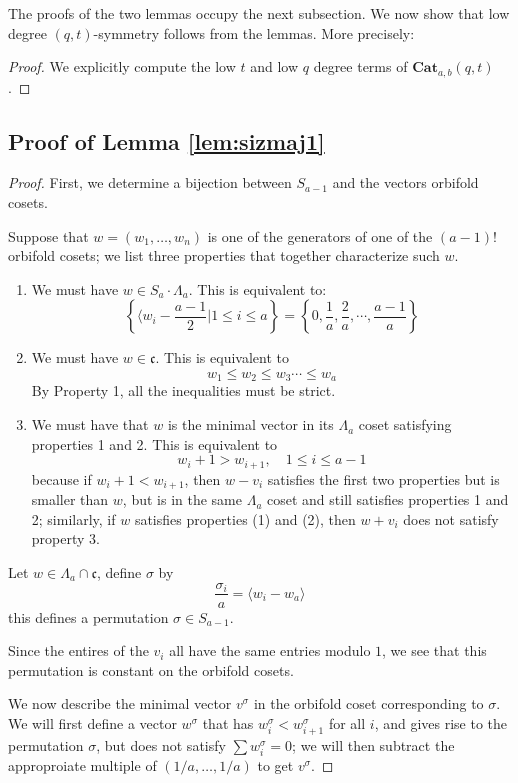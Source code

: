 \documentclass{amsart}[12pt]
\theoremstyle{definition}
\newcommand{\Cat}{\mathbf{Cat}}
\newcommand{\cone}{\mathfrak{c}}
\begin{document}
The proofs of the two lemmas occupy the next subsection.  We now show that low degree $(q,t)$-symmetry follows from the lemmas.  More precisely:


\begin{proof}
We explicitly compute the low $t$ and low $q$ degree terms of $\Cat_{a,b}(q,t)$.  


\end{proof}

\subsection{Proof of Lemma \ref{lem:sizmaj1}}
\begin{proof}
First, we determine a bijection between $S_{a-1}$ and the vectors orbifold cosets.  

Suppose that $w=(w_1,\dots, w_n)$ is one of the generators of one of the $(a-1)!$ orbifold cosets; we list three properties that together characterize such $w$.

\begin{enumerate}

\item We must have $w\in S_a\cdot \Lambda_a$. This is equivalent to:
$$\left\{ \langle w_i-\frac{a-1}{2}\Big| 1\leq i\leq a\right\}=\left\{0,\frac{1}{a},\frac{2}{a},\cdots,\frac{a-1}{a}\right\}$$

\item We must have $w\in\cone$.  This is equivalent to 
$$w_1\leq w_2 \leq w_3\cdots\leq w_a$$
By Property 1, all the inequalities must be strict.

\item We must have that $w$ is the minimal vector in its $\Lambda_a$  coset satisfying properties 1 and 2.  This is equivalent to
$$w_i+1>w_{i+1},\quad 1\leq i\leq a-1$$
because if $w_i+1<w_{i+1}$, then $w-v_i$ satisfies the first two properties but is smaller than $w$, but is in the same $\Lambda_a$ coset and still satisfies properties 1 and 2; similarly, if $w$ satisfies properties (1) and (2), then $w+v_i$ does not satisfy property 3.
\end{enumerate}

Let $w\in\Lambda_a\cap \cone$, define $\sigma$ by 
$$\frac{\sigma_i}{a}=\langle w_{i}-w_a\rangle$$
this defines a permutation $\sigma\in S_{a-1}$.

Since the entires of the $v_i$ all have the same entries modulo $1$, we see that this permutation is constant on the orbifold cosets.  

We now describe the minimal vector $v^\sigma$ in the orbifold coset corresponding to $\sigma$.  We will first define a vector $w^\sigma$ that has $w^\sigma_i<w^\sigma_{i+1}$ for all $i$, and gives rise to the permutation $\sigma$, but does not satisfy $\sum w_i^\sigma=0$; we will then subtract the approproiate multiple of $(1/a,\dots, 1/a)$ to get $v^\sigma$.


\end{proof}
\end{document}
